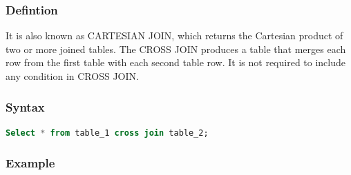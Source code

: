 \documentclass[11pt]{article}
\begin{document}
\subsubsection*{Defintion}

It is also known as CARTESIAN JOIN, which returns the Cartesian product of two or more joined tables. The CROSS JOIN produces a table that merges each row from the first table with each second table row. It is not required to include any condition in CROSS JOIN.

\subsubsection*{Syntax}

\begin{lstlisting}[language=sql]
Select * from table_1 cross join table_2;  
\end{lstlisting}

\subsubsection*{Example}
\end{document}
